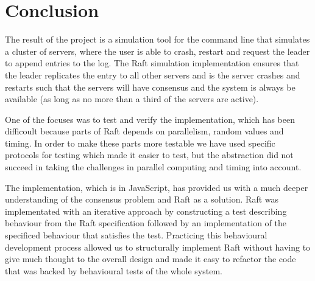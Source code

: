\section{Conclusion} %
\label{sec:conclusion}

The result of the project is a simulation tool for the command line that simulates a cluster of servers, where the user is able to crash, restart and request the leader to append entries to the log. The Raft simulation implementation ensures that the leader replicates the entry to all other servers and is the server crashes and restarts such that the servers will have consensus and the system is always be available (as long as no more than a third of the servers are active).

One of the focuses was to test and verify the implementation, which has been difficoult because parts of Raft depends on parallelism, random values and timing. In order to make these parts more testable we have used specific protocols for testing which made it easier to test, but the abstraction did not succeed in taking the challenges in parallel computing and timing into account.

The implementation, which is in JavaScript, has provided us with a much deeper understanding of the consensus problem and Raft as a solution. Raft was implementated with an iterative approach by constructing a test describing behaviour from the Raft specification followed by an implementation of the specificed behaviour that satisfies the test. Practicing this behavioural development process allowed us to structurally implement Raft without having to give much thought to the overall design and made it easy to refactor the code that was backed by behavioural tests of the whole system.

